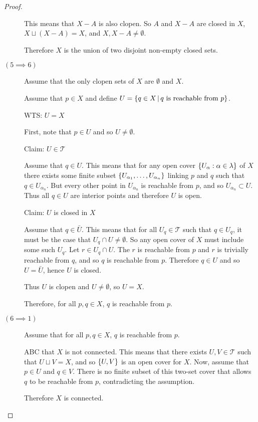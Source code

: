 \documentclass[letterpaper,12pt,fleqn]{article}
\newcommand{\T}{\mathscr{T}}
\renewcommand{\a}{\alpha}
\renewcommand{\l}{\lambda}
\begin{document}
\begin{proof}
\begin{description}
    This means that \(X-A\) is also clopen.  So \(A\) and \(X-A\) are closed in \(X\), \(X\sqcup(X-A)=X\),
    and \(X,X-A\ne\emptyset\).

    Therefore \(X\) is the union of two disjoint non-empty closed sets.

  \item[\((5\implies6)\)] Assume that the only clopen sets of \(X\) are \(\emptyset\) and \(X\).

    Assume that \(p\in X\) and define \(U=\left\{{q\in X}\,\middle|\,{q\ \text{is reachable from}\ p}\right\}\).

    WTS: \(U=X\)

    First, note that \(p\in U\) and so \(U\ne\emptyset\).

    Claim: \(U\in\T\)

    Assume that \(q\in U\).  This means that for any open cover \(\set{U_{\a}:\a\in\l}\) of \(X\) there exists some
    finite subset \(\set{U_{\a_1},\ldots,U_{\a_n}}\) linking \(p\) and \(q\) such that \(q\in U_{\a_n}\).  But
    every other point in \(U_{\a_n}\) is reachable from \(p\), and so \(U_{\a_n}\subset U\).  Thus all \(q\in U\)
    are interior points and therefore \(U\) is open.

    Claim: \(U\) is closed in \(X\)

    Assume that \(q\in\bar{U}\).  This means that for all \(U_q\in\T\) such that \(q\in U_q\), it must be the case
    that \(U_q\cap U\ne\emptyset\).  So any open cover of \(X\) must include some such \(U_q\).  Let
    \(r\in U_q\cap U\).  The \(r\) is reachable from \(p\) and \(r\) is trivially reachable from \(q\), and so
    \(q\) is reachable from \(p\).  Therefore \(q\in U\) and so \(U=\bar{U}\), hence \(U\) is closed.

    Thus \(U\) is clopen and \(U\ne\emptyset\), so \(U=X\).

    Therefore, for all \(p,q\in X\), \(q\) is reachable from \(p\).

  \item[\((6\implies1)\)] Assume that for all \(p,q\in X\), \(q\) is reachable from \(p\).

    ABC that \(X\) is not connected.  This means that there exists \(U,V\in\T\) such that \(U\sqcup V=X\), and so
    \(\{U,V\}\) is an open cover for \(X\).  Now, assume that \(p\in U\) and \(q\in V\).  There is no finite
    subset of this two-set cover that allows \(q\) to be reachable from \(p\), contradicting the assumption.

    Therefore \(X\) is connected.
  \end{description}
\end{proof}
\end{document}
